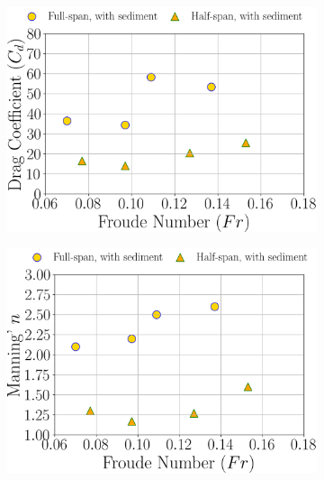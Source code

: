 \documentclass[preview, border=2pt]{standalone}
\begin{document}
\begin{figure}
     \centering     
     \begin{subfigure}[b]{0.48\textwidth}
         \centering
         \caption{}
         \includegraphics[width=\textwidth]{Cd_Fr_dependence_with_sediment_cases.png}
     \end{subfigure}
     \hfill     
     \begin{subfigure}[b]{0.48\textwidth}
         \centering
         \caption{}
         \includegraphics[width=\textwidth]{ManningN_Fr_dependence_with_sediment_cases.png}
     \end{subfigure}
     \hfill     
     \begin{subfigure}[b]{0.48\textwidth}
         \centering
         \caption{}

\end{subfigure}
\end{figure}
\end{document}
